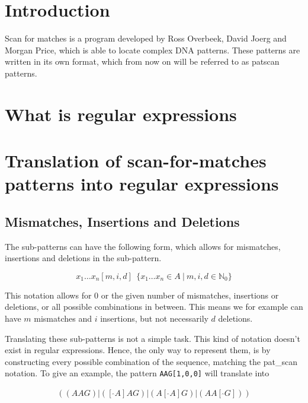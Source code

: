 \documentclass[12pt]{article}
\begin{document}
\newpage

\section{Introduction}

Scan for matches is a program developed by Ross Overbeek, David Joerg and Morgan Price, which is able to locate complex DNA patterns. These patterns are written in its own format, which from now on will be referred to as patscan patterns.

\newpage

\section{What is regular expressions}

\newpage

\section{Translation of scan-for-matches patterns into regular expressions}

\subsection{Mismatches, Insertions and Deletions}

The sub-patterns can have the following form, which allows for mismatches, insertions and deletions in the sub-pattern. 

\begin{equation}
	x_1 \ldots x_n[m, i, d] \ \ \{ x_1 \ldots x_n \in A \ | \ m, i, d \in \mathbb{N}_0 \}
\end{equation} 

This notation allows for 0 or the given number of mismatches, insertions or deletions, or all possible combinations in between. This means we for example can have $m$ mismatches and $i$ insertions, but not necessarily $d$ deletions.

Translating these sub-patterns is not a simple task. This kind of notation doesn't exist in regular expressions. Hence, the only way to represent them, is by constructing every possible combination of the sequence, matching the pat\_scan notation. To give an example, the pattern \texttt{AAG[1,0,0]} will translate into

\begin{eqnarray}
	((AAG)|([\ \hat{}A]AG)|(A[\ \hat{}A]G)|(AA[\ \hat{}G]))
\end{eqnarray}
\end{document}
